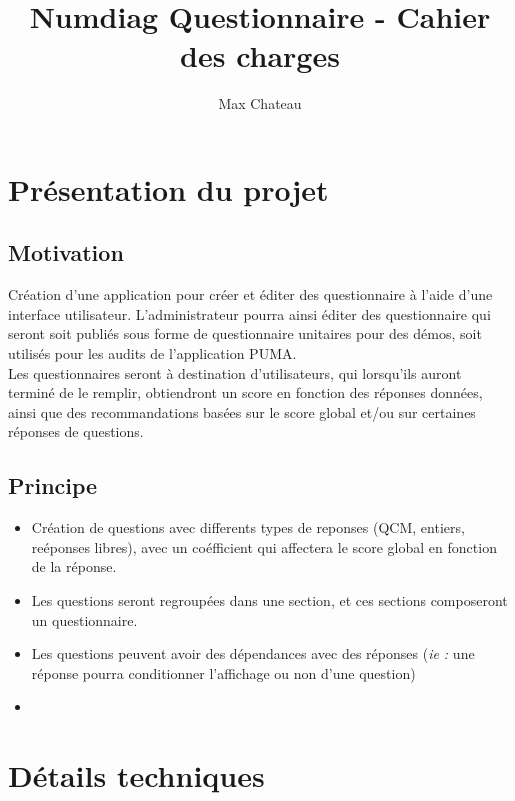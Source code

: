 \documentclass{extarticle}
\title{Numdiag Questionnaire - Cahier des charges}
\author{Max Chateau}
\date{}
\begin{document}
\maketitle{}
\section{Présentation du projet}
\subsection{Motivation}
Création d'une application pour créer et éditer des questionnaire à l'aide d'une interface utilisateur.
L'administrateur pourra ainsi éditer des questionnaire qui seront soit publiés sous forme de questionnaire unitaires pour des démos, soit utilisés pour les audits de l'application PUMA.\\
Les questionnaires seront à destination d'utilisateurs, qui lorsqu'ils auront terminé de le remplir, obtiendront un score en fonction des réponses données, ainsi que des recommandations basées sur le score global et/ou sur certaines réponses de questions.

\subsection{Principe}
\begin{itemize}
	\item Création de questions avec differents types de reponses (QCM, entiers, reéponses libres), avec un coéfficient qui affectera le score global en fonction de la réponse.
	\item Les questions seront regroupées dans une section, et ces sections composeront un questionnaire.
	\item Les questions peuvent avoir des dépendances avec des réponses (\textit{ie :} une réponse pourra conditionner l'affichage ou non d'une question)
	\item 
\end{itemize}

\section{Détails techniques}
\end{document}
